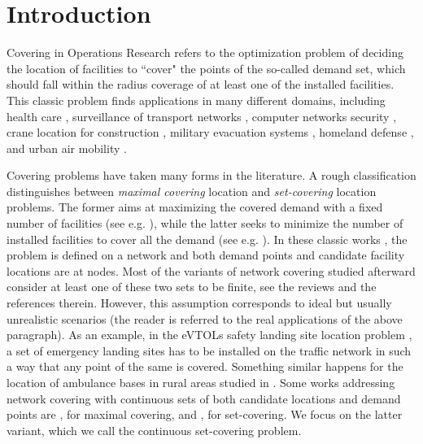 \documentclass[review]{elsarticle}
\theoremstyle{definition}
\begin{document}
\section{Introduction}
Covering in Operations Research refers to the optimization problem of deciding the location of facilities to ``cover" the points of the so-called demand set, which should fall within the radius coverage of at least one of the installed facilities.
This classic problem finds applications in many different domains, including health care \cite{health}, surveillance of transport networks \cite{Gusev20}, computer networks security \cite{worm}, crane location for construction \cite{crane}, military evacuation systems \cite{military}, homeland defense \cite{homeland}, and urban air mobility \cite{liding}.

Covering problems have taken many forms in the literature. A rough classification distinguishes between \emph{maximal covering} location and \emph{set-covering} location problems. The former aims at maximizing the covered demand with a fixed number of facilities (see e.g. \cite{Church74}), while the latter seeks to minimize the number of installed facilities to cover all the demand (see e.g. \cite{Toregas72}). In these classic works \cite{Church74,Toregas72}, the problem is defined on a network and both demand points and candidate facility locations are at nodes. Most of the variants of network covering studied afterward consider at least one of these two sets to be finite, see the reviews \cite{chapter-plastria,chapter-marin} and the references therein. However, this assumption corresponds to ideal but usually unrealistic scenarios (the reader is referred to the real applications of the above paragraph). As an example, in the eVTOLs safety landing site location problem \cite{liding}, a set of emergency landing sites has to be installed on the traffic network in such a way that any point of the same is covered. Something similar happens for the location of ambulance bases in rural areas studied in \cite{health}.
Some works addressing network covering with continuous sets of both candidate locations and demand points are \cite{Carrizosa16,Kalsics,Baldomero}, for maximal covering, and \cite{Gurevich84,Hamacher20,Hartmann21}, for set-covering. We focus on the latter variant, which we call the continuous set-covering problem.
\end{document}
